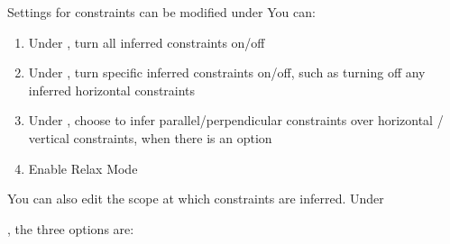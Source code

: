 Settings for constraints can be modified under  You can:


\begin{enumerate}
    \item Under , turn all inferred constraints on/off
    \item Under , turn specific inferred constraints on/off, such as turning off any inferred horizontal constraints
    \item Under , choose to infer parallel/perpendicular constraints over horizontal / vertical constraints, when there is an option
    \item Enable Relax Mode
\end{enumerate}

You can also edit the scope at which constraints are inferred. Under 

, the three options are:

